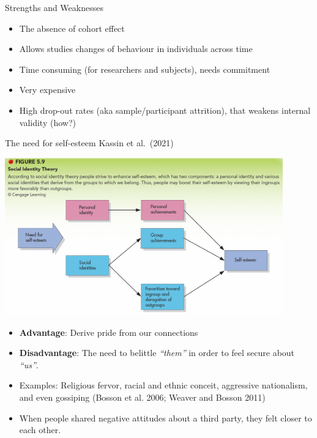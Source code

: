 \documentclass[
  ignorenonframetext,
  aspectratio=169,
]{beamer}
\providecommand{\tightlist}{%
  \setlength{\itemsep}{0pt}\setlength{\parskip}{0pt}}\usepackage{longtable,booktabs,array}
\begin{document}
\begin{frame}{Strengths and Weaknesses}
\label{strengths-and-weaknesses}
\begin{itemize}[<+->]
\tightlist
\item
  The absence of cohort effect
\item
  Allows studies changes of behaviour in individuals across time
\item
  Time consuming (for researchers and subjects), needs commitment
\item
  Very expensive
\item
  High drop-out rates (aka sample/participant attrition), that weakens
  internal validity (how?)
\end{itemize}
\end{frame}

\begin{frame}{The need for self-esteem}
\label{the-need-for-self-esteem}
Kassin et al.~(2021)

\includegraphics[width=0.9\textwidth,height=\textheight]{figs/selfesteem.png}
\end{frame}

\begin{frame}
\begin{itemize}[<+->]
\tightlist
\item
  \textbf{Advantage}: Derive pride from our connections
\item
  \textbf{Disadvantage}: The need to belittle \emph{``them''} in order
  to feel secure about \emph{``us''}.
\item
  Examples: Religious fervor, racial and ethnic conceit, aggressive
  nationalism, and even gossiping (Bosson et al. 2006; Weaver and Bosson
  2011)
\item
  When people shared negative attitudes about a third party, they felt
  closer to each other.
\end{itemize}
\end{frame}
\end{document}
